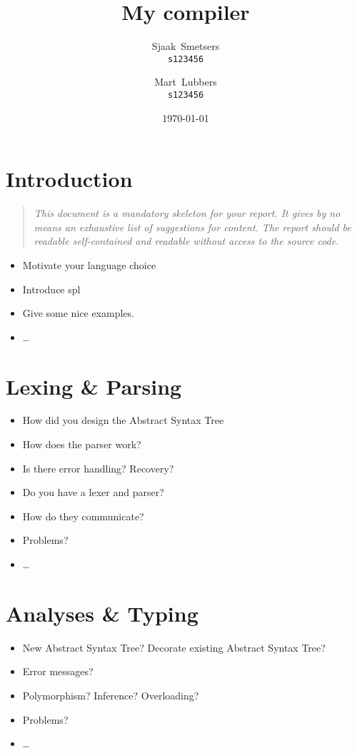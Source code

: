 \documentclass{report}
\author{%
	Sjaak~Smetsers\\
	\small\texttt{s123456}\and
	Mart~Lubbers\\
	\small\texttt{s123456}
}
\date{\today}
\title{My compiler}
\begin{document}
\maketitle%

\tableofcontents%

\chapter{Introduction}
\begin{quote}
	\it
	This document is a mandatory skeleton for your report.
	It gives by no means an exhaustive list of suggestions for content.
	The report should be readable self-contained and readable without access to the source code.
\end{quote}
\begin{itemize}
	\item Motivate your language choice
	\item Introduce spl
	\item Give some nice examples.
	\item \ldots
\end{itemize}

\chapter{Lexing \& Parsing}
\begin{itemize}
	\item How did you design the Abstract Syntax Tree
	\item How does the parser work?
	\item Is there error handling? Recovery?
	\item Do you have a lexer and parser?
	\item How do they communicate?
	\item Problems?
	\item\ldots
\end{itemize}

\chapter{Analyses \& Typing}
\begin{itemize}
	\item New Abstract Syntax Tree? Decorate existing Abstract Syntax Tree?
	\item Error messages?
	\item Polymorphism? Inference? Overloading?
	\item Problems?
	\item\ldots
\end{itemize}
\end{document}

